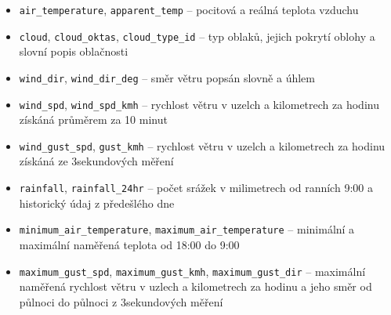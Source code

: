 \documentclass[10pt,a4paper,titlepage]{extarticle}
\begin{document}
\begin{itemize}
\begin{itemize}[label=\textperiodcentered]
        \item \texttt{air\_temperature}, \texttt{apparent\_temp} -- pocitová a reálná teplota vzduchu
        \item \texttt{cloud}, \texttt{cloud\_oktas}, \texttt{cloud\_type\_id} -- typ oblaků, jejich pokrytí oblohy a slovní popis oblačnosti
        \item \texttt{wind\_dir}, \texttt{wind\_dir\_deg} -- směr větru popsán slovně a úhlem 
        \item \texttt{wind\_spd}, \texttt{wind\_spd\_kmh} -- rychlost větru v uzelch a kilometrech za hodinu získáná průměrem za 10 minut
        \item \texttt{wind\_gust\_spd}, \texttt{gust\_kmh} -- rychlost větru v uzelch a kilometrech za hodinu získáná
        ze 3sekundových měření
        \item \texttt{rainfall}, \texttt{rainfall\_24hr} -- počet srážek v milimetrech od ranních 9:00 a historický
        údaj z předešlého dne
        \item \texttt{minimum\_air\_temperature}, \texttt{maximum\_air\_temperature} -- minimální a maximální naměřená teplota od 18:00 do 9:00
        \item \texttt{maximum\_gust\_spd}, \texttt{maximum\_gust\_kmh}, \texttt{maximum\_gust\_dir} -- maximální
        naměřená rychlost větru v uzlech a kilometrech za hodinu a jeho směr od půlnoci do půlnoci z 3sekundových měření
    \end{itemize}
\end{itemize}
\end{document}
